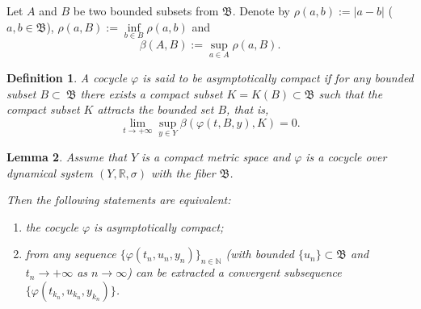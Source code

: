 \documentclass{amsart}%
\newtheorem{lemma}{Lemma}[section]
\newtheorem{definition}[lemma]{Definition}
\begin{document}
Let $A$ and $B$ be two bounded subsets from $\mathfrak B$. Denote
by $\rho(a,b):=|a-b|$ ($a,b\in \mathfrak B$),
$\rho(a,B):=\inf\limits_{b\in B}\rho(a,b)$ and
\begin{equation}\label{eqAC1}
\beta(A,B):=\sup\limits_{a\in A}\rho(a,B).
\end{equation}

\begin{definition}\label{defAC1} A cocycle $\varphi$ is said to be
asymptotically compact if for any bounded subset $B\subset \
\mathfrak B$ there exists a compact subset $K=K(B)\subset
\mathfrak B$ such that the compact subset $K$ attracts the bounded
set $B$, that is,
\begin{equation}\label{eqAC2}
\lim\limits_{t\to +\infty}\sup\limits_{y\in
Y}\beta(\varphi(t,B,y),K)=0 .
\end{equation}
\end{definition}

\begin{lemma}\label{lAC1} \cite[Ch.I]{Che_2015} Assume that $Y$ is a compact metric space and
$\varphi$ is a cocycle over dynamical system $(Y,\mathbb
R,\sigma)$ with the fiber $\mathfrak B$.

Then the following statements are equivalent:
\begin{enumerate}
\item the cocycle $\varphi$ is asymptotically compact; \item from
any sequence $\{\varphi(t_n,u_n,y_n)\}_{n\in \mathbb N}$ (with
bounded $\{u_n\}\subset \mathfrak B$ and $t_n\to +\infty$ as $n\to
\infty$) can be extracted a convergent subsequence
$\{\varphi(t_{k_n},u_{k_n},y_{k_n})\}$.
\end{enumerate}
\end{lemma}
\end{document}
